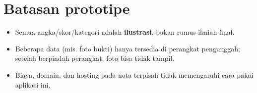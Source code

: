 \documentclass[11pt,a4paper]{article}
\begin{document}
\section{Batasan prototipe}
\begin{itemize}
  \item Semua angka/skor/kategori adalah \textbf{ilustrasi}, bukan rumus ilmiah final.
  \item Beberapa data (mis. foto bukti) hanya tersedia di perangkat pengunggah;
        setelah berpindah perangkat, foto bisa tidak tampil.
  \item Biaya, domain, dan hosting pada nota terpisah tidak memengaruhi cara pakai
        aplikasi ini.
\end{itemize}
\end{document}
